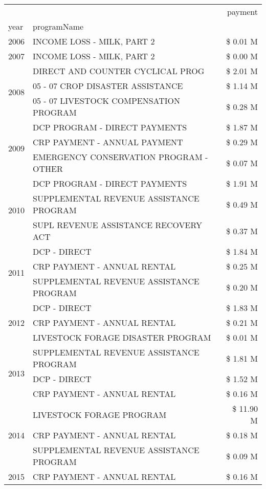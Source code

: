 \begin{tabular}{llr}
\toprule
 &  & payment \\
year & programName &  \\
\midrule
2006 & INCOME LOSS - MILK, PART 2 & \$ 0.01 M \\
\cline{1-3}
2007 & INCOME LOSS - MILK, PART 2 & \$ 0.00 M \\
\cline{1-3}
\multirow[t]{3}{*}{2008} & DIRECT AND COUNTER CYCLICAL PROG & \$ 2.01 M \\
 & 05 - 07 CROP DISASTER ASSISTANCE & \$ 1.14 M \\
 & 05 - 07 LIVESTOCK COMPENSATION PROGRAM & \$ 0.28 M \\
\cline{1-3}
\multirow[t]{3}{*}{2009} & DCP PROGRAM - DIRECT PAYMENTS & \$ 1.87 M \\
 & CRP PAYMENT - ANNUAL PAYMENT & \$ 0.29 M \\
 & EMERGENCY CONSERVATION PROGRAM - OTHER & \$ 0.07 M \\
\cline{1-3}
\multirow[t]{3}{*}{2010} & DCP PROGRAM - DIRECT PAYMENTS & \$ 1.91 M \\
 & SUPPLEMENTAL REVENUE ASSISTANCE PROGRAM & \$ 0.49 M \\
 & SUPL REVENUE ASSISTANCE RECOVERY ACT & \$ 0.37 M \\
\cline{1-3}
\multirow[t]{3}{*}{2011} & DCP - DIRECT & \$ 1.84 M \\
 & CRP PAYMENT - ANNUAL RENTAL & \$ 0.25 M \\
 & SUPPLEMENTAL REVENUE ASSISTANCE PROGRAM & \$ 0.20 M \\
\cline{1-3}
\multirow[t]{3}{*}{2012} & DCP - DIRECT & \$ 1.83 M \\
 & CRP PAYMENT - ANNUAL RENTAL & \$ 0.21 M \\
 & LIVESTOCK FORAGE DISASTER PROGRAM & \$ 0.01 M \\
\cline{1-3}
\multirow[t]{3}{*}{2013} & SUPPLEMENTAL REVENUE ASSISTANCE PROGRAM & \$ 1.81 M \\
 & DCP - DIRECT & \$ 1.52 M \\
 & CRP PAYMENT - ANNUAL RENTAL & \$ 0.16 M \\
\cline{1-3}
\multirow[t]{3}{*}{2014} & LIVESTOCK FORAGE PROGRAM & \$ 11.90 M \\
 & CRP PAYMENT - ANNUAL RENTAL & \$ 0.18 M \\
 & SUPPLEMENTAL REVENUE ASSISTANCE PROGRAM & \$ 0.09 M \\
\cline{1-3}
\multirow[t]{3}{*}{2015} & CRP PAYMENT - ANNUAL RENTAL & \$ 0.16 M \\

\end{tabular}
